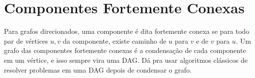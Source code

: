 
    \section{Componentes Fortemente Conexas}

    Para grafos direcionados, uma componente é dita fortemente conexa se para todo par de vértices $u,v$ da componente, existe caminho de $u$ para $v$ e de $v$ para $u$. Um grafo das componentes fortemente conexas é a condensação de cada componente em um vértice, e isso sempre vira uma DAG. Dá pra usar algoritmos clássicos de resolver problemas em uma DAG depois de condensar o grafo.
    
